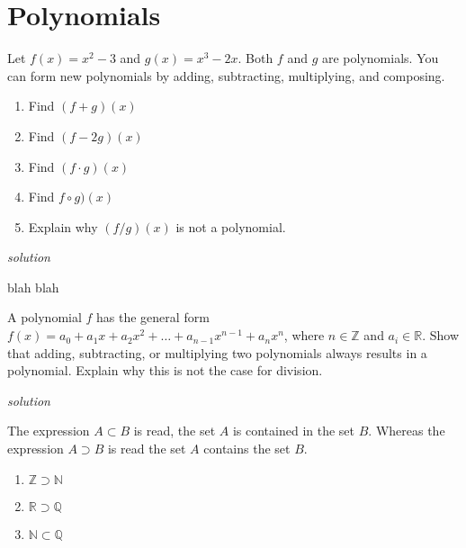 \documentclass{amsbook}
\begin{document}
\section{Polynomials}



\begin{Exercise}[title={Polynomials I}, difficulty=0 , label=1a1 ]
	Let $f(x)=x^2-3$ and $g(x)=x^3-2x$. Both $f$ and $g$ are polynomials. You can form new polynomials by adding, subtracting, multiplying, and composing. 
        \begin{enumerate}
            \item Find $(f+g)(x)$
            \item Find $(f-2g)(x)$
            \item Find $(f\cdot g)(x)$
            \item Find $f \circ g)(x)$
            \item Explain why $(f/g)(x)$ is not a polynomial.
        \end{enumerate}

	\hfill \emph{solution} 
\end{Exercise}

\begin{Answer}[ref={1a1}]
	blah blah
\end{Answer}

\begin{Exercise}[title={Defining Polynomials}, difficulty=1, label=1a2]
A polynomial $f$ has the general form $f(x)=a_0+a_1 x + a_2 x^2 + \ldots +a_{n-1}x^{n-1} + a_nx^n$, where $n \in \mathbb{Z}$ and $a_i \in \mathbb{R}$. Show that adding, subtracting, or multiplying two polynomials always results in a polynomial. Explain why this is not the case for division.

    \hfill \emph{solution} 
\end{Exercise}

\begin{Answer}[ref={1a2}]
    The expression $A \subset B$ is read, the set $A$ is contained in the set $B$. Whereas the expression $A \supset B$ is read the set $A$ contains the set $B$.
    \begin{enumerate}
        \item $\mathbb{Z}\supset \mathbb{N}$
        \item $\mathbb{R}\supset \mathbb{Q}$
        \item $\mathbb{N} \subset \mathbb{Q}$
    \end{enumerate}
\end{Answer}
\end{document}
